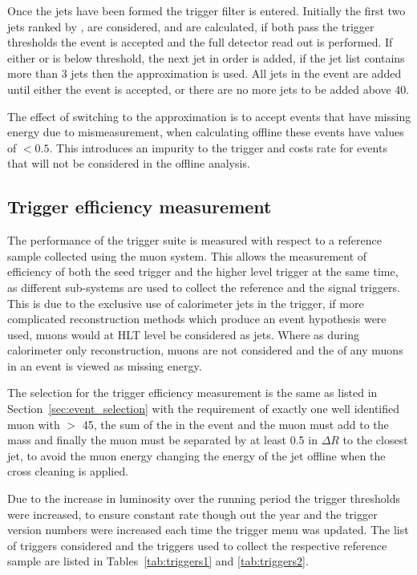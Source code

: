 Once the jets have been formed the trigger filter is entered. Initially the 
first two jets ranked by \ET, are considered, \HT and \alt are calculated, if 
both pass the trigger thresholds the event is accepted and the full detector 
read out is performed. If either \HT or \alt is below threshold, the next jet 
in \ET order is added, if the jet list contains more than 3 jets then the 
\bt approximation is used. All jets in the event are added until either the 
event is accepted, or there are no more jets to be added above \unit{40}{\GeV}.

The effect of switching to the \bt approximation is to accept events that have 
missing energy due to mismeasurement, when calculating \alt offline these 
events have values of \alt $< 0.5$. This introduces an impurity to the trigger 
and costs rate for events that will not be considered in the offline analysis.


\subsection{Trigger efficiency measurement} %
\label{sub:trigger_efficiency_measurement}

The performance of the \alt trigger suite is measured with respect to a 
reference sample collected using the muon system. This allows the measurement 
of efficiency of both the \Lone seed trigger and the higher level trigger at 
the same time, as different sub-systems are used to collect the reference and 
the signal triggers. This is due to the exclusive use of calorimeter jets in 
the \alt trigger, if more complicated reconstruction methods which produce an 
event hypothesis were used, muons would at HLT level be considered as 
jets. Where as during calorimeter only reconstruction, muons are not considered 
and the \pt of any muons in an event is viewed as missing energy.

The selection for the trigger efficiency measurement is the same as listed in 
Section~\ref{sec:event_selection} with the requirement of exactly one well 
identified muon with \PT $>$ \unit{45}{\GeV}, the sum of the \MET in the event 
and the muon must add to the \PW mass and finally the muon must be separated by 
at least 0.5 in $\Delta R$ to the closest jet, to avoid the muon energy 
changing the energy of the jet offline when the cross cleaning is applied.

Due to the increase in luminosity over the running period the trigger 
thresholds were increased, to ensure constant rate though out the year and the 
trigger version numbers were increased each time the trigger menu was updated.
The list of triggers considered and the triggers used to collect the respective 
reference sample are listed in Tables~\ref{tab:triggers1} and 
\ref{tab:triggers2}.

